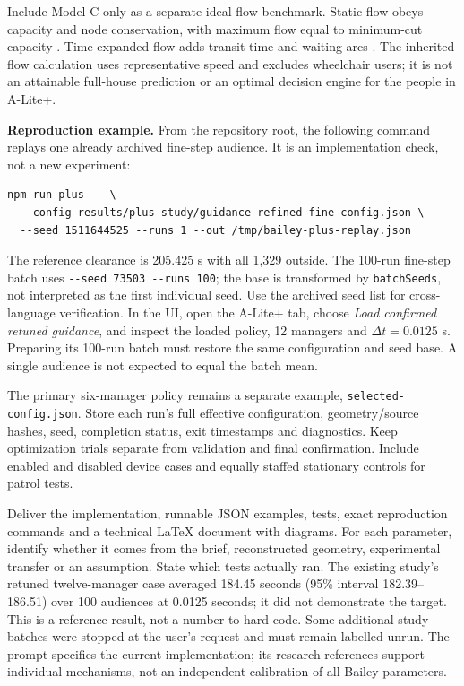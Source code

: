 \documentclass[11pt,a4paper]{article}
\newcommand{\code}[1]{{\small\nolinkurl{#1}}}
\begin{document}
Include Model C only as a separate ideal-flow benchmark. Static flow obeys capacity and node conservation, with maximum flow equal to minimum-cut capacity \cite{ford1956}. Time-expanded flow adds transit-time and waiting arcs \cite{ford1958}. The inherited flow calculation uses representative speed and excludes wheelchair users; it is not an attainable full-house prediction or an optimal decision engine for the people in A-Lite+.

\textbf{Reproduction example.} From the repository root, the following command replays one already archived fine-step audience. It is an implementation check, not a new experiment:
\begin{lstlisting}
npm run plus -- \
  --config results/plus-study/guidance-refined-fine-config.json \
  --seed 1511644525 --runs 1 --out /tmp/bailey-plus-replay.json
\end{lstlisting}
The reference clearance is 205.425 s with all 1,329 outside. The 100-run fine-step batch uses \code{--seed 73503 --runs 100}; the base is transformed by \code{batchSeeds}, not interpreted as the first individual seed. Use the archived seed list for cross-language verification. In the UI, open the A-Lite+ tab, choose \emph{Load confirmed retuned guidance}, and inspect the loaded policy, 12 managers and $\Delta t=0.0125$ s. Preparing its 100-run batch must restore the same configuration and seed base. A single audience is not expected to equal the batch mean.

The primary six-manager policy remains a separate example, \code{selected-config.json}. Store each run's full effective configuration, geometry/source hashes, seed, completion status, exit timestamps and diagnostics. Keep optimization trials separate from validation and final confirmation. Include enabled and disabled device cases and equally staffed stationary controls for patrol tests.

Deliver the implementation, runnable JSON examples, tests, exact reproduction commands and a technical LaTeX document with diagrams. For each parameter, identify whether it comes from the brief, reconstructed geometry, experimental transfer or an assumption. State which tests actually ran. The existing study's retuned twelve-manager case averaged 184.45 seconds (95\% interval 182.39--186.51) over 100 audiences at 0.0125 seconds; it did not demonstrate the target. This is a reference result, not a number to hard-code. Some additional study batches were stopped at the user's request and must remain labelled unrun. The prompt specifies the current implementation; its research references support individual mechanisms, not an independent calibration of all Bailey parameters.
\end{document}
